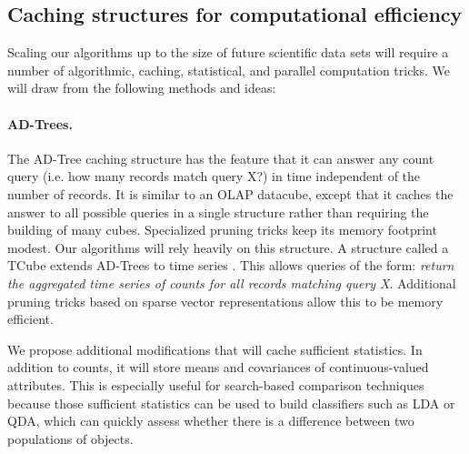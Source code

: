 \documentclass[prd,nofootbib,floatfix,11pt,tightenlines,nofootinbib]{revtex4}
\begin{document}

\subsection{Caching structures for computational efficiency}
\label{sec:computationalefficiency}

Scaling our algorithms up to the size of future scientific data sets will
require a number of algorithmic, caching, statistical, and parallel
computation tricks.  We will draw from the following methods and ideas:

\paragraph{AD-Trees.}
The AD-Tree \cite{Moore97a} caching structure has the feature that it can
answer any count query (i.e. how many records match query X?) in time
independent of the number of records.  It is similar to an OLAP datacube,
except that it caches the answer to all possible queries in a single
structure rather than requiring the building of many cubes.  Specialized
pruning tricks keep its memory footprint modest.  Our algorithms will rely
heavily on this structure. A structure called a TCube extends AD-Trees to
time series \cite{Sabhnani06}.  This allows queries of the form: {\it
  return the aggregated time series of counts for all records matching
  query X}.  Additional pruning tricks based on sparse vector
representations allow this to be memory efficient.

We propose additional modifications that will cache sufficient statistics.
In addition to counts, it will store means and covariances of
continuous-valued attributes.  This is especially useful for search-based
comparison techniques because those sufficient statistics can be used to
build classifiers such as LDA or QDA, which can quickly assess whether
there is a difference between two populations of objects.

\end{document}
